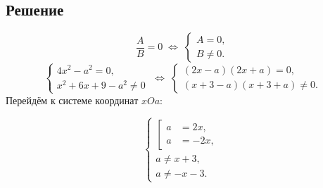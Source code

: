 \documentclass[12pt,a4paper]{article}
\newcommand{\eqv}{\;\Longleftrightarrow\;}
\begin{document}
\subsection{Решение}
\[
\frac AB=0\eqv\begin{cases}A=0,\\B\ne0.\end{cases}
\]
\[
\begin{cases}
4x^2-a^2=0,\\
x^2+6x+9-a^2\ne0
\end{cases}
\eqv
\begin{cases}
(2x-a)(2x+a)=0,\\
(x+3-a)(x+3+a)\ne0.
\end{cases}
\]
Перейдём к системе координат $xOa$:
\begin{formulaBox}
\[
\begin{cases}
\left[\begin{aligned}
a&=2x,\\
a&=-2x,
\end{aligned}\right.\\[1mm]
a\ne x+3,\\
a\ne -x-3.
\end{cases}
\]
\end{formulaBox}
\end{document}
